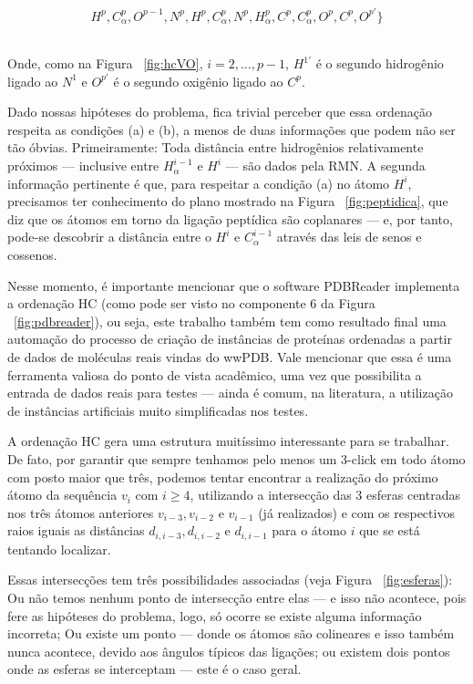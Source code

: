 \documentclass[a4paper,12pt]{article}
\begin{document}
	\hspace{4.5cm}
	\begin{minipage}{0.532\linewidth}
		\vspace{-0.7cm}
		$$
		H^p, C_{\alpha}^p, O^{p-1}, N^p, H^p, C^{p}_\alpha, N^p, H^{p}_\alpha, C^p, C_{\alpha}^p, O^p, C^p, O^{p'}\}
		$$
	\end{minipage}
	\\

	Onde, como na Figura ~\ref{fig:hcVO}, $i = 2, \dots, p-1$, $H^{1'}$ é o segundo hidrogênio ligado ao $N^1$ e $O^{p'}$ é o segundo oxigênio ligado ao $C^p$.
	
	Dado nossas hipóteses do problema, fica trivial perceber que essa ordenação respeita as condições (a) e (b), a menos de duas informações que podem não ser tão óbvias. Primeiramente: Toda distância entre hidrogênios relativamente próximos --- inclusive entre $H_\alpha^{i-1}$ e $H^{i}$ --- são dados pela RMN. A segunda informação pertinente é que, para respeitar a condição (a) no átomo $H^i$, precisamos ter conhecimento do plano mostrado na Figura ~\ref{fig:peptidica}, que diz que os átomos em torno da ligação peptídica são coplanares --- e, por tanto, pode-se descobrir a distância entre o $H^i$ e $C_\alpha^{i-1}$ através das leis de senos e cossenos. 
 	
 	Nesse momento, é importante mencionar que o software PDBReader implementa a ordenação HC (como pode ser visto no componente 6 da Figura ~\ref{fig:pdbreader}), ou seja, este trabalho também tem como resultado final uma automação do processo de criação de instâncias de proteínas ordenadas a partir de dados de moléculas reais vindas do wwPDB. Vale mencionar que essa é uma ferramenta valiosa do ponto de vista acadêmico, uma vez que possibilita a entrada de dados reais para testes --- ainda é comum, na literatura, a utilização de instâncias artificiais muito simplificadas nos testes. 
 	
 	A ordenação HC gera uma estrutura muitíssimo interessante para se trabalhar. De fato, por garantir que sempre tenhamos pelo menos um 3-click em todo átomo com posto maior que três, podemos tentar encontrar a realização do próximo átomo da sequência $v_i$ com $i \geq 4$, utilizando a intersecção das 3 esferas centradas nos três átomos anteriores $v_{i-3}, v_{i-2}$ e $v_{i-1}$ (já realizados) e com os respectivos raios iguais as distâncias $d_{i,i-3}, d_{i,i-2}$ e $d_{i,i-1}$ para o átomo $i$ que se está tentando localizar. 
 	
 	Essas intersecções tem três possibilidades associadas (veja Figura ~\ref{fig:esferas}): Ou não temos nenhum ponto de intersecção entre elas --- e isso não acontece, pois fere as hipóteses do problema, logo, só ocorre se existe alguma informação incorreta; Ou existe um ponto --- donde os átomos são colineares e isso também nunca acontece, devido aos ângulos típicos das ligações; ou existem dois pontos onde as esferas se interceptam --- este é o caso geral.
 	
\end{document}
